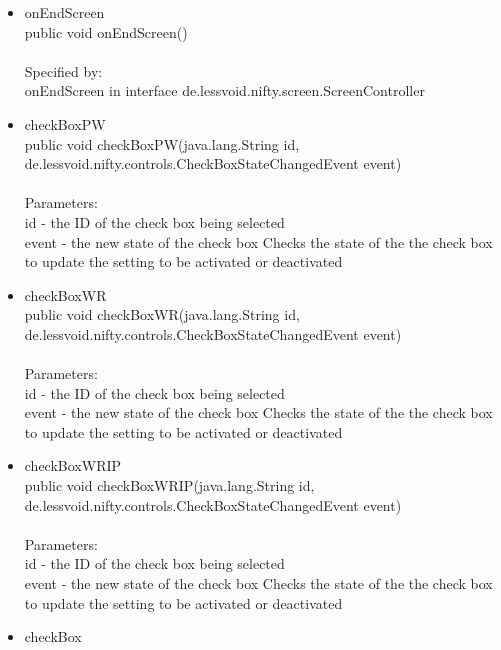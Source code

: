\documentclass[letterpaper]{article}
\begin{document}
\begin{itemize}
\begin{itemize}
													\item	onEndScreen \\
															public void onEndScreen() \\ \\
															Specified by: \\
															onEndScreen in interface de.lessvoid.nifty.screen.ScreenController
													\item	checkBoxPW \\
															public void checkBoxPW(java.lang.String id, \\
						              de.lessvoid.nifty.controls.CheckBoxStateChangedEvent event) \\ \\
															Parameters: \\
															id - the ID of the check box being selected \\
															event - the new state of the check box Checks the state of the the check box to update the setting to be activated or deactivated
													\item	checkBoxWR \\
															public void checkBoxWR(java.lang.String id, \\
						              de.lessvoid.nifty.controls.CheckBoxStateChangedEvent event) \\ \\
															Parameters: \\
															id - the ID of the check box being selected \\
															event - the new state of the check box Checks the state of the the check box to update the setting to be activated or deactivated
													\item	checkBoxWRIP \\
															public void checkBoxWRIP(java.lang.String id, \\
						                de.lessvoid.nifty.controls.CheckBoxStateChangedEvent event) \\ \\
															Parameters: \\
															id - the ID of the check box being selected \\
															event - the new state of the check box Checks the state of the the check box to update the setting to be activated or deactivated
													\item	checkBox \\

\end{itemize}
\end{itemize}
\end{document}
